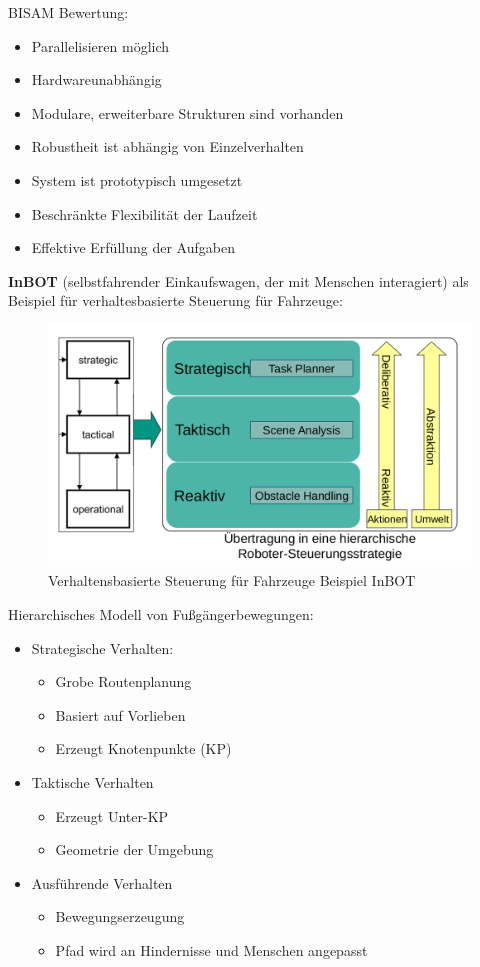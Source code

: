 BISAM Bewertung:
\begin{itemize}
	\item Parallelisieren möglich
	\item Hardwareunabhängig
	\item Modulare, erweiterbare Strukturen sind vorhanden
	\item Robustheit ist abhängig von Einzelverhalten
	\item System ist prototypisch umgesetzt
	\item Beschränkte Flexibilität der Laufzeit
	\item Effektive Erfüllung der Aufgaben
\end{itemize}
\noindent
\textbf{InBOT} (selbstfahrender Einkaufswagen, der mit Menschen interagiert) als Beispiel für verhaltesbasierte Steuerung für Fahrzeuge:
\begin{figure}[h!]
	\includegraphics[width=\textwidth]{figures/inbot.png}
	\caption{Verhaltensbasierte Steuerung für Fahrzeuge Beispiel InBOT}
	\label{ch:08:fig:inbot}
\end{figure}
Hierarchisches Modell von Fußgängerbewegungen:
\begin{itemize}
	\item Strategische Verhalten:
	\begin{itemize}
		\item Grobe Routenplanung
		\item Basiert auf Vorlieben
		\item Erzeugt Knotenpunkte (KP)
	\end{itemize}
	\item Taktische Verhalten
	\begin{itemize}
		\item Erzeugt Unter-KP
		\item Geometrie der Umgebung
	\end{itemize}
	\item Ausführende Verhalten
	\begin{itemize}
		\item Bewegungserzeugung
		\item Pfad wird an Hindernisse und Menschen angepasst
	\end{itemize}
\end{itemize}

